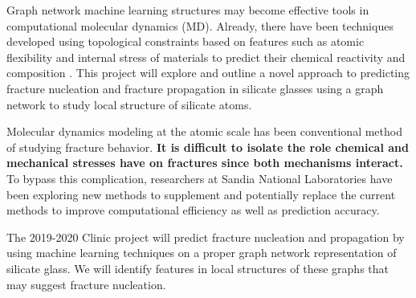 Graph network machine learning structures may become effective tools in  computational molecular dynamics (MD). Already, there have been techniques developed using topological constraints based on features such as atomic flexibility and internal stress of materials to predict their chemical reactivity and composition \cite{bauchy}. This project will explore and outline a novel approach to predicting fracture nucleation and fracture propagation in silicate glasses using a graph network to study local structure of silicate atoms. 

Molecular dynamics modeling at the atomic scale has been conventional method of studying fracture behavior. \textbf{It is difficult to isolate the role chemical and mechanical stresses have on fractures since both mechanisms interact. } To bypass this complication, researchers at Sandia National Laboratories have been exploring new methods to supplement and potentially replace the current methods to improve computational efficiency as well as prediction accuracy. 

The 2019-2020 Clinic project will predict fracture nucleation and propagation by using machine learning techniques on a proper graph network representation of silicate glass. We will identify features in local structures of these graphs that may suggest fracture nucleation.